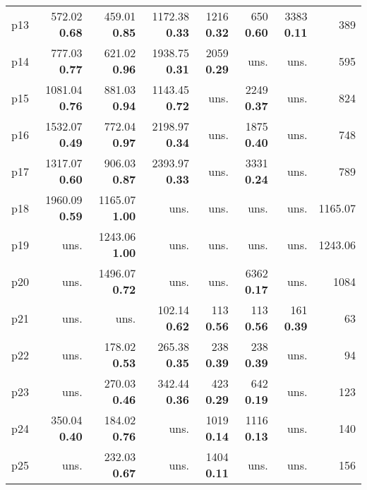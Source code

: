 \begin{tabular}{|l|rrrrrr|r|}
p13 & {\footnotesize 572.02} \textbf{0.68} & {\footnotesize 459.01} \textbf{0.85} & {\footnotesize 1172.38} \textbf{0.33} & {\footnotesize 1216} \textbf{0.32} & {\footnotesize 650} \textbf{0.60} & {\footnotesize 3383} \textbf{0.11} & 389\\
p14 & {\footnotesize 777.03} \textbf{0.77} & {\footnotesize 621.02} \textbf{0.96} & {\footnotesize 1938.75} \textbf{0.31} & {\footnotesize 2059} \textbf{0.29} & uns. & uns. & 595\\
p15 & {\footnotesize 1081.04} \textbf{0.76} & {\footnotesize 881.03} \textbf{0.94} & {\footnotesize 1143.45} \textbf{0.72} & uns. & {\footnotesize 2249} \textbf{0.37} & uns. & 824\\
p16 & {\footnotesize 1532.07} \textbf{0.49} & {\footnotesize 772.04} \textbf{0.97} & {\footnotesize 2198.97} \textbf{0.34} & uns. & {\footnotesize 1875} \textbf{0.40} & uns. & 748\\
p17 & {\footnotesize 1317.07} \textbf{0.60} & {\footnotesize 906.03} \textbf{0.87} & {\footnotesize 2393.97} \textbf{0.33} & uns. & {\footnotesize 3331} \textbf{0.24} & uns. & 789\\
p18 & {\footnotesize 1960.09} \textbf{0.59} & {\footnotesize 1165.07} \textbf{1.00} & uns. & uns. & uns. & uns. & 1165.07\\
p19 & uns. & {\footnotesize 1243.06} \textbf{1.00} & uns. & uns. & uns. & uns. & 1243.06\\
p20 & uns. & {\footnotesize 1496.07} \textbf{0.72} & uns. & uns. & {\footnotesize 6362} \textbf{0.17} & uns. & 1084\\
p21 & uns. & uns. & {\footnotesize 102.14} \textbf{0.62} & {\footnotesize 113} \textbf{0.56} & {\footnotesize 113} \textbf{0.56} & {\footnotesize 161} \textbf{0.39} & 63\\
p22 & uns. & {\footnotesize 178.02} \textbf{0.53} & {\footnotesize 265.38} \textbf{0.35} & {\footnotesize 238} \textbf{0.39} & {\footnotesize 238} \textbf{0.39} & uns. & 94\\
p23 & uns. & {\footnotesize 270.03} \textbf{0.46} & {\footnotesize 342.44} \textbf{0.36} & {\footnotesize 423} \textbf{0.29} & {\footnotesize 642} \textbf{0.19} & uns. & 123\\
p24 & {\footnotesize 350.04} \textbf{0.40} & {\footnotesize 184.02} \textbf{0.76} & uns. & {\footnotesize 1019} \textbf{0.14} & {\footnotesize 1116} \textbf{0.13} & uns. & 140\\
p25 & uns. & {\footnotesize 232.03} \textbf{0.67} & uns. & {\footnotesize 1404} \textbf{0.11} & uns. & uns. & 156\\

\end{tabular}
